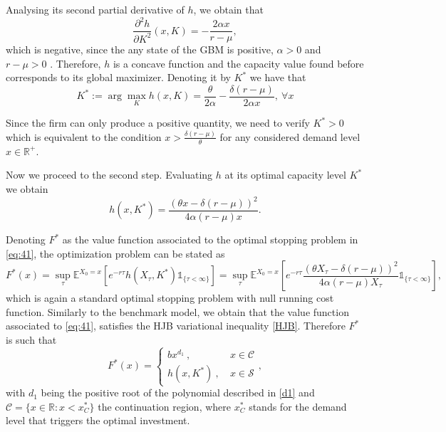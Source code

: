 Analysing its second partial derivative of $h$, we obtain that
\begin{equation}
\frac{\partial^2 h }{\partial K^2}(x,K)=  -\frac{2\alpha x}{r-\mu},
\label{1_d2K}
\end{equation}
which is negative, since the any state of the GBM is positive, $\alpha>0$ and $r-\mu>0$ . Therefore, $h$ is a concave function and the capacity value found before corresponds to its global maximizer. Denoting it by $K^*$ we have that
\begin{equation}
K^*:= \arg \max_K h(x,K)=\frac{\theta}{2\alpha}-\frac{\delta (r-\mu)}{2 \alpha x},\ \forall x 
\label{eq:K41}
\end{equation}

Since the firm can only produce a positive quantity, we need to verify $K^* >0 $ which is equivalent to the condition  $x > \frac{\delta(r-\mu)}{\theta} $ for any considered demand level $x \in \mathds{R}^+$.

Now we proceed to the second step. Evaluating $h$ at its optimal capacity level $K^*$ we obtain
$$h(x,K^*)=\frac{(\theta x -\delta (r-\mu))^2}{4 \alpha (r-\mu) x}.$$

Denoting $F^*$ as the value function associated to the optimal stopping problem in \eqref{eq:41}, the optimization problem can be stated as
\begin{equation}
F^*(x)=\sup_\tau \mathds{E}^{X_0=x}\left[ e^{-r\tau}h(X_\tau,K^*) \mathds{1}_{\{\tau<\infty\}} \right]
= \sup_\tau \mathds{E}^{X_0=x}\left[ e^{-r\tau} \frac{(\theta X_\tau -\delta (r-\mu))^2}{4 \alpha (r-\mu) X_\tau} \mathds{1}_{\{\tau<\infty\}}\right],
\label{eq:41}
\end{equation}
which is again a standard optimal stopping problem with null running cost function. Similarly to the benchmark model, we obtain that the value function associated to \eqref{eq:41}, satisfies the HJB variational inequality \eqref{HJB}. Therefore $F^*$ is such that
\begin{equation}
F^*(x)=\begin{cases} b x^{d_1}  \ , \ &x \in \mathcal{C} \\
h(x,K^*) \ , \ &x \in \mathcal{S}
\end{cases},
\label{1_F*}
\end{equation}
with $d_1$ being the positive root of the polynomial described in \eqref{d1} and $\mathcal{C}=\{x\in \mathds{R}:x< x_C^* \}$ the continuation region, where $x_C^*$ stands for the demand level that triggers the optimal investment.

